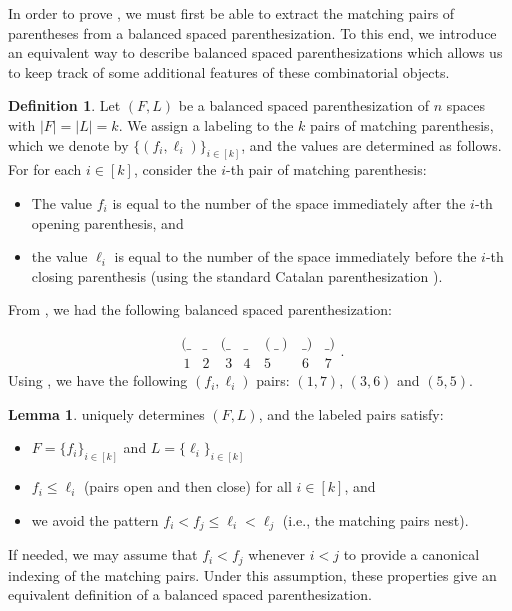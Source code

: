 \documentclass{amsart}
\theoremstyle{definition}
\newtheorem{lemma}[theorem]{Lemma}
\theoremstyle{definition}
\newtheorem{definition}{Definition}[section]
\theoremstyle{remark}
\begin{document}
In order to prove , we must first be able to extract the matching pairs of parentheses from a balanced spaced parenthesization.
To this end, we introduce an equivalent way to describe balanced spaced parenthesizations which allows us to keep track of some additional features of these combinatorial objects.

\begin{definition}\label{lem:matching algorithm}
    Let $(F,L)$ be a balanced spaced parenthesization of $n$ spaces with $|F|=|L|=k$.
    We assign a labeling to the $k$ pairs of matching parenthesis, which we denote by $\{(f_i,\ell_i)\}_{i\in[k]}$, and the values are determined as follows. For for each $i\in[k]$, consider the $i$-th pair of matching parenthesis:
    \begin{itemize}
        \item The value $f_i$ is equal to the number of the space immediately after the $i$-th opening parenthesis, and 
        \item the value $\ell_i$ is equal to the number of the space immediately before the $i$-th closing parenthesis (using the standard Catalan parenthesization \cite{catalan_ex}). 
    \end{itemize}
\end{definition}

From , we had the following balanced spaced parenthesization:

\[\begin{smallmatrix}(\_&\_&(\_&\_&(\_)&\_)&\_)\\\,1&2&\,\,3&4&\,5\,&6\,\,&7\,\end{smallmatrix}.\]
Using , we have the following $(f_i, \ell_i)$ pairs: $(1,7)$, $(3,6)$ and $(5,5)$.

\begin{lemma}\label{lem:matching_pairs_new}
     uniquely determines $(F,L)$, and the labeled pairs  satisfy:
    \begin{itemize}
        \item $F=\{f_i\}_{i\in[k]}$ and $L=\{\ell_i\}_{i\in[k]}$
        \item $f_i\le \ell_i$ (pairs open and then close) for all $i\in[k]$, and
        \item we avoid the pattern $f_i<f_j\le \ell_i<\ell_j$ (i.e., the matching pairs nest).
    \end{itemize}
    If needed, we may assume that $f_i<f_j$ whenever $i<j$ to provide a canonical indexing of the matching pairs. Under this assumption, these properties give an equivalent definition of a balanced spaced parenthesization.
\end{lemma}
\end{document}

